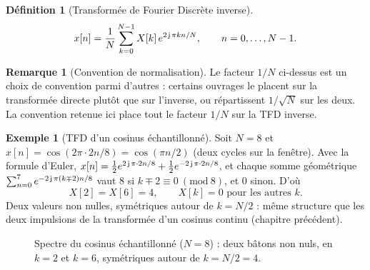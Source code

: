 \documentclass[a4paper,11pt]{article}
\theoremstyle{definition}
\newtheorem{definition}{Définition}[section]
\newtheorem{exemple}{Exemple}[section]
\newtheorem{remark}{Remarque}[section]
\begin{document}
\begin{definition}[Transformée de Fourier Discrète inverse]
    $$
        x[n] = \frac1N \sum_{k=0}^{N-1} X[k]\,e^{2\operatorname{\mathsf{j}}\pi kn/N}, \qquad n=0,\dots,N-1.
    $$
\end{definition}

\begin{remark}[Convention de normalisation]
    Le facteur $1/N$ ci-dessus est un choix de convention parmi
    d'autres : certains ouvrages le placent sur la transformée directe
    plutôt que sur l'inverse, ou répartissent $1/\sqrt N$ sur les deux.
    La convention retenue ici place tout le facteur $1/N$ sur la TFD
    inverse.
\end{remark}

\begin{exemple}[TFD d'un cosinus échantillonné]
    Soit $N=8$ et $x[n]=\cos(2\pi\cdot2n/8)=\cos(\pi n/2)$ (deux cycles
    sur la fenêtre). Avec la formule d'Euler,
    $x[n]=\tfrac12e^{2\operatorname{\mathsf{j}}\pi\cdot2n/8}+\tfrac12e^{-2\operatorname{\mathsf{j}}\pi\cdot2n/8}$,
    et chaque somme géométrique $\sum_{n=0}^{7}e^{-2\operatorname{\mathsf{j}}\pi(k\mp2)n/8}$
    vaut $8$ si $k\mp2\equiv0\ (\mathrm{mod}\ 8)$, et $0$ sinon. D'où
    $$
        X[2]=X[6]=4, \qquad X[k]=0 \text{ pour les autres } k.
    $$
    Deux valeurs non nulles, symétriques autour de $k=N/2$ : même
    structure que les deux impulsions de la transformée d'un cosinus
    continu (chapitre précédent).
\end{exemple}

\begin{figure}[h]
    \centering
    \caption{Spectre du cosinus échantillonné ($N=8$) : deux bâtons non nuls, en $k=2$ et $k=6$, symétriques autour de $k=N/2=4$.}
    \label{fig:spectre-cosinus}
\end{figure}
\end{document}
